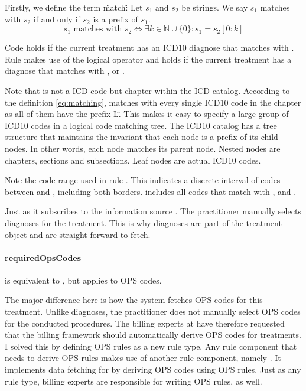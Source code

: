Firstly, we define the term \"match\":
Let \( s_1 \) and \( s_2 \) be strings.
We say \( s_1 \) matches with \( s_2 \) if and only if \( s_2 \) is a prefix of \( s_1 \).
\begin{equation}\label{eq:matching}
    s_1 \text{ matches with } s_2 \iff \exists k \in \mathbb{N} \cup \{0\} : s_1 = s_2[0:k]
\end{equation}

Code  holds if the current treatment has an ICD10 diagnose that matches with .
Rule  makes use of the logical  operator and holds if the current treatment has a diagnose that matches with ,  or .

Note that  is not a ICD code but chapter within the ICD catalog.
According to the definition \ref{eq:matching},  matches with every single ICD10 code in the  chapter as all of them have the prefix \"L\".
This makes it easy to specify a large group of ICD10 codes in a logical code matching tree.
The ICD10 catalog has a tree structure that maintains the invariant that each node is a prefix of its child nodes.
In other words, each node matches its parent node.
Nested nodes are chapters, sections and subsections.
Leaf nodes are actual ICD10 codes.

Note the code range  used in rule .
This indicates a discrete interval of codes between  and , including both borders.
 includes all codes that match with ,  and .

Just as  it subscribes to the information source .
The practitioner manually selects diagnoses for the treatment.
This is why diagnoses are part of the treatment object and are straight-forward to fetch.

\paragraph{requiredOpsCodes}

 is equivalent to , but applies to OPS codes.

The major difference here is how the system fetches OPS codes for this treatment.
Unlike diagnoses, the practitioner does not manually select OPS codes for the conducted procedures.
The billing experts at \AV have therefore requested that the billing framework should automatically derive OPS codes for treatments.
I solved this by defining OPS rules as a new rule type.
Any rule component that needs to derive OPS rules makes use of another rule component, namely .
It implements data fetching for  by deriving OPS codes using OPS rules.
Just as any rule type, billing experts are responsible for writing OPS rules, as well.

